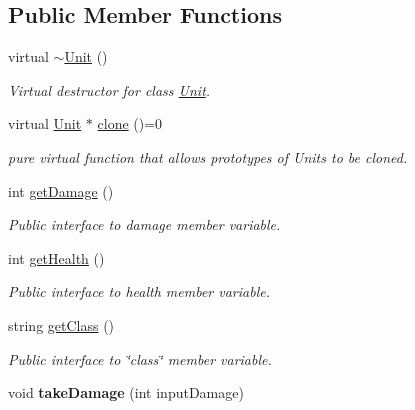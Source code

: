 \subsection*{Public Member Functions}
\begin{DoxyCompactItemize}
\item 
\hypertarget{class_unit_a6353fc4c0a329997ad4abcf0dcb4eb27}{}virtual \hyperlink{class_unit_a6353fc4c0a329997ad4abcf0dcb4eb27}{$\sim$\+Unit} ()\label{class_unit_a6353fc4c0a329997ad4abcf0dcb4eb27}

\begin{DoxyCompactList}\small\item\em Virtual destructor for class \hyperlink{class_unit}{Unit}. \end{DoxyCompactList}\item 
virtual \hyperlink{class_unit}{Unit} $\ast$ \hyperlink{class_unit_add809c0669cb6b08afae913da60c4cc1}{clone} ()=0
\begin{DoxyCompactList}\small\item\em pure virtual function that allows prototypes of Units to be cloned. \end{DoxyCompactList}\item 
int \hyperlink{class_unit_a7b0dbed96660669a2234b715018781fa}{get\+Damage} ()
\begin{DoxyCompactList}\small\item\em Public interface to damage member variable. \end{DoxyCompactList}\item 
int \hyperlink{class_unit_a610a98a68a3e99227b15af4161f26b70}{get\+Health} ()
\begin{DoxyCompactList}\small\item\em Public interface to health member variable. \end{DoxyCompactList}\item 
string \hyperlink{class_unit_a4c4dde0419950aa3b44302bbff2af810}{get\+Class} ()
\begin{DoxyCompactList}\small\item\em Public interface to \char`\"{}class\char`\"{} member variable. \end{DoxyCompactList}\item 
\hypertarget{class_unit_a23dbc595c29e30de9309945353aae884}{}void {\bfseries take\+Damage} (int input\+Damage)\label{class_unit_a23dbc595c29e30de9309945353aae884}

\end{DoxyCompactItemize}
